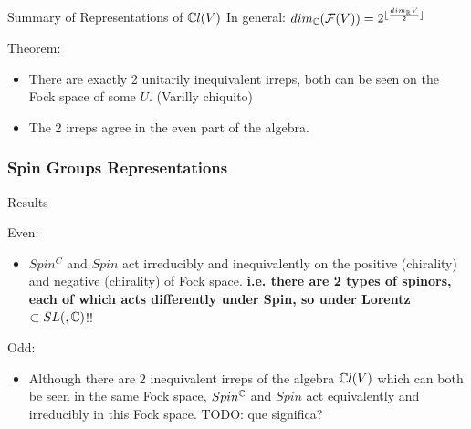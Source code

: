 \begin{frame}{Summary of Representations of $\mathbb C l(V)$}
    In general: $dim_\mathbb C (\mathcal F(V)) = 2^{\lfloor\frac{dim_\mathbb R V}{2} \rfloor}$
    
    Theorem: 
        \begin{itemize}
        
        \item There are exactly 2 unitarily inequivalent irreps, both can be seen on the Fock space of some $U$. (Varilly chiquito)
        
        \item The 2 irreps agree in the even part of the algebra.
        
        \end{itemize}
\end{frame}

\subsubsection{Spin Groups Representations}

\begin{frame}{Results} %

    Even:
        \begin{itemize}
            
        \item $Spin^C$ and $Spin$ act irreducibly and inequivalently on the positive (chirality) and negative (chirality) of Fock space. \textbf{i.e. there are 2 types of spinors, each of which acts differently under Spin, so under Lorentz $\subset SL(, \mathbb C)$}!!
            
        \end{itemize}
    
    Odd:
        \begin{itemize}
        
        \item Although there are $2$ inequivalent irreps of the algebra $\mathbb C l(V)$ which can both be seen in the same Fock space, $Spin^\mathbb C$ and $Spin$ act equivalently and irreducibly in this Fock space. TODO: que significa?
        
        \end{itemize}

\end{frame}
